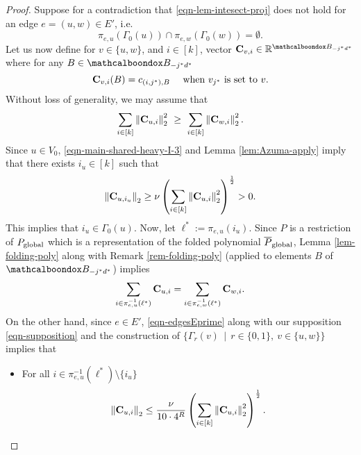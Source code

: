 \begin{proof}
Suppose for a contradiction that \eqref{eqn-lem-intesect-proj} does not hold for an edge $e = (u,w) \in E'$, i.e.
\begin{equation}\label{eqn-supposition}
\pi_{e,u}\left(\Gamma_0(u)\right)\cap \pi_{e,w}\left(\Gamma_0(w)\right) = \emptyset.
\end{equation}
Let us now define for $v \in\{u, w\}$, and $i \in [k]$, vector ${\bf C}_{v, i} \in \mathbb{R}^{\mcb{B}_{-j^*d^*}}$ where for
any $B \in \mcb{B}_{-j^*d^*}$
\begin{equation}
{\bf C}_{v, i}(B) = c_{(i,j^*),B} \ \ \ \tn{ when } v_{j^*}\tn{ is set to }v.
\end{equation}
Without loss of generality, we may assume that 
\begin{equation}\label{eqn-WLOG-umore}
\sum_{i\in [k]} \left\|{\bf C}_{u, i}\right\|_2^2 \ \geq \ \sum_{i\in [k]} \left\|{\bf C}_{w, i}\right\|_2^2.
\end{equation}
Since $u \in V_0$, \eqref{eqn-main-shared-heavy-I-3} and Lemma \ref{lem:Azuma-apply} imply that there exists $i_u \in [k]$ such that
\begin{equation}\label{eqn-u-distinguished}
\left\|{\bf C}_{u, i_u}\right\|_2 \geq \nu\left(\sum_{i\in [k]} \left\|{\bf C}_{u, i}\right\|_2^2\right)^{\frac{1}{2}} > 0.
\end{equation}
This implies that $i_u \in \Gamma_0(u)$.
Now, let $\ell^* := \pi_{e,u}(i_u)$. Since $P$ is a restriction of $P_{\textnormal{global}}$ which is a representation of the folded polynomial $\overline{P}_{\textnormal{global}}$, Lemma \ref{lem-folding-poly}
along with Remark \ref{rem-folding-poly} (applied to elements $B$ of $\mcb{B}_{-j^*d^*}$) implies
\begin{equation}\label{eqn-apply-folding}
\sum_{i \in \pi_{e,u}^{-1}(\ell^*)}{\bf C}_{u, i} = \sum_{i \in \pi_{e,w}^{-1}(\ell^*)}{\bf C}_{w, i}.
\end{equation}
On the other hand, since $e \in E'$, \eqref{eqn-edgesEprime} along with our supposition \eqref{eqn-supposition} and the construction of $\{\Gamma_r(v)\,\mid\, r\in\{0,1\},\ v\in\{u,w\}\}$  
implies that
\begin{itemize}
\item For all $i \in \pi_{e,u}^{-1}(\ell^*)\setminus\{i_u\}$
\begin{equation}\label{eqn-projbd-1}
\left\|{\bf C}_{u, i}\right\|_2 \leq \frac{\nu}{10\cdot 4^R} \left(\sum_{i\in [k]} \left\|{\bf C}_{u, i}\right\|_2^2\right)^{\frac{1}{2}}.
\end{equation}

\end{itemize}
\end{proof}
